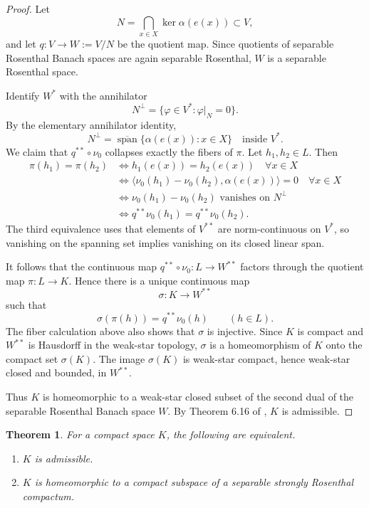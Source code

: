 \documentclass[11pt]{article}
\newtheorem{theorem}{Theorem}
\begin{document}
\begin{proof}
Let
\[
  N=\bigcap_{x\in X}\ker \alpha(e(x)) \subset V,
\]
and let \(q:V\to W:=V/N\) be the quotient map.  Since quotients of separable
Rosenthal Banach spaces are again separable Rosenthal, \(W\) is a separable
Rosenthal space.

Identify \(W^*\) with the annihilator
\[
  N^\perp=\{\varphi\in V^*: \varphi|_N=0\}.
\]
By the elementary annihilator identity,
\[
  N^\perp=\overline{\operatorname{span}}\{\alpha(e(x)):x\in X\}
  \quad\text{inside }V^*.
\]
We claim that \(q^{**}\circ\nu_0\) collapses exactly the fibers of \(\pi\).
Let \(h_1,h_2\in L\).  Then
\[
\begin{aligned}
  \pi(h_1)=\pi(h_2)
  &\iff h_1(e(x))=h_2(e(x)) \quad \forall x\in X\\
  &\iff \langle \nu_0(h_1)-\nu_0(h_2),\alpha(e(x))\rangle=0
     \quad \forall x\in X\\
  &\iff \nu_0(h_1)-\nu_0(h_2)\text{ vanishes on }N^\perp\\
  &\iff q^{**}\nu_0(h_1)=q^{**}\nu_0(h_2).
\end{aligned}
\]
The third equivalence uses that elements of \(V^{**}\) are norm-continuous on
\(V^*\), so vanishing on the spanning set implies vanishing on its closed
linear span.

It follows that the continuous map \(q^{**}\circ\nu_0:L\to W^{**}\) factors
through the quotient map \(\pi:L\to K\).  Hence there is a unique continuous
map
\[
  \sigma:K\to W^{**}
\]
such that
\[
  \sigma(\pi(h))=q^{**}\nu_0(h) \qquad (h\in L).
\]
The fiber calculation above also shows that \(\sigma\) is injective.  Since
\(K\) is compact and \(W^{**}\) is Hausdorff in the weak-star topology,
\(\sigma\) is a homeomorphism of \(K\) onto the compact set \(\sigma(K)\).
The image \(\sigma(K)\) is weak-star compact, hence weak-star closed and
bounded, in \(W^{**}\).

Thus \(K\) is homeomorphic to a weak-star closed subset of the second dual of
the separable Rosenthal Banach space \(W\).  By Theorem 6.16 of
\cite{GM0803}, \(K\) is admissible.
\end{proof}

\begin{theorem}
For a compact space \(K\), the following are equivalent.
\begin{enumerate}
  \item \(K\) is admissible.
  \item \(K\) is homeomorphic to a compact subspace of a separable strongly
  Rosenthal compactum.
\end{enumerate}
\end{theorem}
\end{document}
